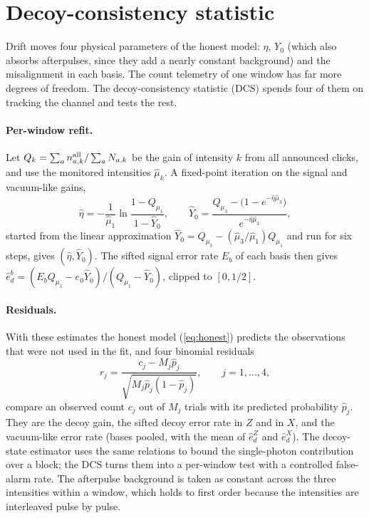 \section{Decoy-consistency statistic}\label{sec:dcs}

Drift moves four physical parameters of the honest model: $\eta$, $Y_0$ (which also absorbs afterpulses, since they add a nearly constant background) and the misalignment in each basis. The count telemetry of one window has far more degrees of freedom. The decoy-consistency statistic (DCS) spends four of them on tracking the channel and tests the rest.

\paragraph{Per-window refit.} Let $Q_k=\sum_a n^{\rm all}_{a,k}/\sum_a N_{a,k}$ be the gain of intensity $k$ from all announced clicks, and use the monitored intensities $\hat\mu_k$. A fixed-point iteration on the signal and vacuum-like gains,
\begin{equation}\label{eq:fit}
\hat\eta=-\frac{1}{\hat\mu_1}\ln\frac{1-Q_{\mu_1}}{1-\hat Y_0},\qquad
\hat Y_0=\frac{Q_{\mu_3}-\bigl(1-e^{-\hat\eta\hat\mu_3}\bigr)}{e^{-\hat\eta\hat\mu_3}},
\end{equation}
started from the linear approximation $\hat Y_0=Q_{\mu_3}-(\hat\mu_3/\hat\mu_1)Q_{\mu_1}$ and run for six steps, gives $(\hat\eta,\hat Y_0)$. The sifted signal error rate $E_{b}$ of each basis then gives $\hat e_d^b=(E_bQ_{\mu_1}-e_0\hat Y_0)/(Q_{\mu_1}-\hat Y_0)$, clipped to $[0,1/2]$.

\paragraph{Residuals.} With these estimates the honest model (\ref{eq:honest}) predicts the observations that were not used in the fit, and four binomial residuals
\begin{equation}
r_j=\frac{c_j-M_j\hat p_j}{\sqrt{M_j\hat p_j(1-\hat p_j)}},\qquad j=1,\dots,4,
\end{equation}
compare an observed count $c_j$ out of $M_j$ trials with its predicted probability $\hat p_j$. They are the decoy gain, the sifted decoy error rate in $Z$ and in $X$, and the vacuum-like error rate (bases pooled, with the mean of $\hat e_d^Z$ and $\hat e_d^X$). The decoy-state estimator uses the same relations to bound the single-photon contribution over a block; the DCS turns them into a per-window test with a controlled false-alarm rate. The afterpulse background is taken as constant across the three intensities within a window, which holds to first order because the intensities are interleaved pulse by pulse.


